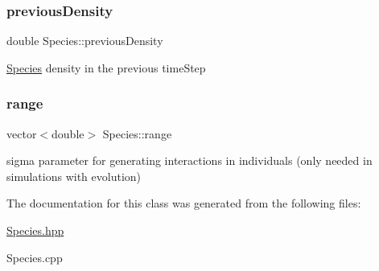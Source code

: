 \subsubsection{\texorpdfstring{previous\+Density}{previousDensity}}
{\footnotesize\ttfamily double Species\+::previous\+Density\hspace{0.3cm}{\ttfamily [protected]}}

\hyperlink{classSpecies}{Species} density in the previous time\+Step \mbox{\label{classSpecies_af95c9259381c434919dd4e9041a65bc7}} 
\subsubsection{\texorpdfstring{range}{range}}
{\footnotesize\ttfamily vector$<$double$>$ Species\+::range\hspace{0.3cm}{\ttfamily [protected]}}

sigma parameter for generating interactions in individuals (only needed in simulations with evolution) 

The documentation for this class was generated from the following files\+:\begin{DoxyCompactItemize}
\item 
\hyperlink{Species_8hpp}{Species.\+hpp}\item 
Species.\+cpp\end{DoxyCompactItemize}
